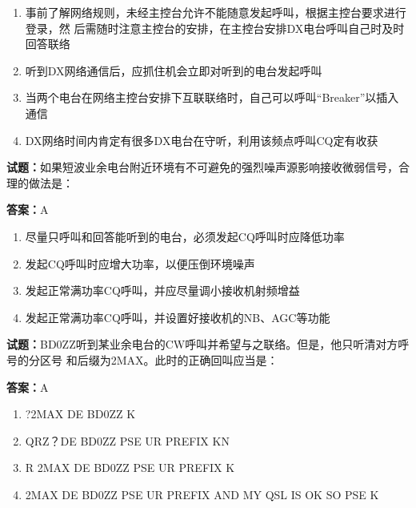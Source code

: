 \documentclass{ctexbook}
\begin{document}
\begin{enumerate}[leftmargin=3em]
  \item 事前了解网络规则，未经主控台允许不能随意发起呼叫，根据主控台要求进行登录，然
后需随时注意主控台的安排，在主控台安排DX电台呼叫自己时及时回答联络 

  \item 听到DX网络通信后，应抓住机会立即对听到的电台发起呼叫 

  \item 当两个电台在网络主控台安排下互联联络时，自己可以呼叫“Breaker”以插入通信 

  \item DX网络时间内肯定有很多DX电台在守听，利用该频点呼叫CQ定有收获 

\end{enumerate}






\vspace{1em}

\textbf{试题：}如果短波业余电台附近环境有不可避免的强烈噪声源影响接收微弱信号，合理的做法是： 

\textbf{答案：}A 

\begin{enumerate}[leftmargin=3em]
  \item 尽量只呼叫和回答能听到的电台，必须发起CQ呼叫时应降低功率 

  \item 发起CQ呼叫时应增大功率，以便压倒环境噪声 

  \item 发起正常满功率CQ呼叫，并应尽量调小接收机射频增益 

  \item 发起正常满功率CQ呼叫，并设置好接收机的NB、AGC等功能 

\end{enumerate}





\vspace{1em}

\textbf{试题：}BD0ZZ听到某业余电台的CW呼叫并希望与之联络。但是，他只听清对方呼号的分区号
和后缀为2MAX。此时的正确回叫应当是： 

\textbf{答案：}A 

\begin{enumerate}[leftmargin=3em]
  \item ?2MAX DE BD0ZZ K 

  \item QRZ？DE BD0ZZ PSE UR PREFIX KN 

  \item R 2MAX DE BD0ZZ PSE UR PREFIX K 

  \item 2MAX DE BD0ZZ PSE UR PREFIX AND MY QSL IS OK SO PSE K 

\end{enumerate}
\end{document}
